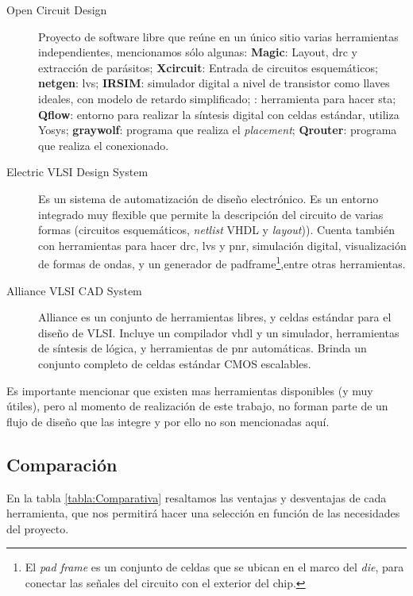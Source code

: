 \begin{description}
\item[Open Circuit Design] Proyecto de software libre que reúne en un único sitio varias herramientas independientes, mencionamos sólo algunas:  \textbf{Magic}: Layout, \gls{drc} y extracción de parásitos; \textbf{Xcircuit}: Entrada de circuitos esquemáticos; \textbf{netgen}: \gls{lvs}; \textbf{IRSIM}: simulador digital a nivel de transistor como llaves ideales, con modelo de retardo simplificado; : herramienta para hacer \gls{sta}; \textbf{Qflow}: entorno para realizar la síntesis digital con celdas estándar, utiliza Yosys\cite{Yosys}; \textbf{graywolf}: programa que realiza el \emph{placement}; \textbf{Qrouter}: programa que realiza el conexionado.

\item[Electric VLSI Design System\cite{Electric}] Es un sistema de automatización de diseño electrónico. Es un entorno integrado muy flexible que permite la descripción del circuito de varias formas (circuitos esquemáticos, \emph{netlist} VHDL y \emph{layout})). Cuenta también con herramientas para hacer \gls{drc}, \gls{lvs} y \gls{pnr}, simulación digital, visualización de formas de ondas, y un generador de \gls{padframe}\footnote{El \emph{pad frame} es un conjunto de celdas que se ubican en el marco del \emph{die}, para conectar las señales del circuito con el exterior del chip.},entre otras herramientas.

\item[Alliance VLSI CAD System\cite{Alliance}] Alliance es un conjunto de herramientas libres, y celdas estándar para el diseño de VLSI. Incluye un compilador vhdl y un simulador, herramientas de síntesis de lógica, y herramientas de \gls{pnr} automáticas. Brinda un conjunto completo de celdas estándar CMOS escalables.

\end{description}

Es importante mencionar que existen mas herramientas disponibles (y muy útiles), pero al momento de realización de este trabajo, no forman parte de un flujo de diseño que las integre y por ello no son mencionadas aquí. 

\subsection{Comparación}
En la tabla \ref{tabla:Comparativa} resaltamos las ventajas y desventajas de cada herramienta, que nos permitirá hacer una selección en función de las necesidades del proyecto.


